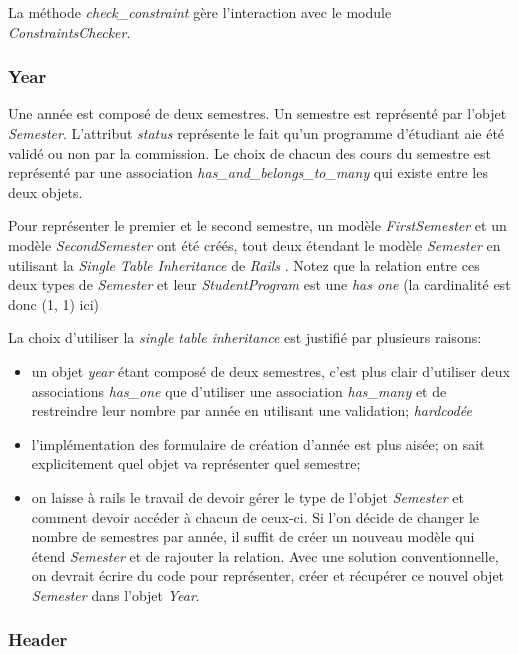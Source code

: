 La méthode \textit{check\_constraint} gère l’interaction avec le module \textit{ConstraintsChecker}. 

\subsubsection{Year}

Une année est composé de deux semestres. Un semestre est représenté par l'objet \textit{Semester}. L'attribut \textit{status} représente le fait qu'un programme d'étudiant aie été validé ou non par la commission. Le choix de chacun des cours du semestre est représenté par une association \textit{has\_and\_belongs\_to\_many} qui existe entre les deux objets.

Pour représenter le premier et le second semestre, un modèle \textit{FirstSemester} et un modèle \textit{SecondSemester} ont été créés, tout deux étendant le modèle \textit{Semester} en utilisant la \textit{Single Table Inheritance} de \textit{Rails} \cite{STI}. Notez que la relation entre ces deux types de \textit{Semester} et leur \textit{StudentProgram} est une \textit{has one} (la cardinalité est donc (1, 1) ici)

La choix d'utiliser la \textit{single table inheritance} est justifié par plusieurs raisons:
\begin{itemize}
  \item un objet \textit{year} étant composé de deux semestres, c'est plus clair d'utiliser deux associations \textit{has\_one} que d'utiliser une association \textit{has\_many} et de restreindre leur nombre par année en utilisant une validation; \textit{hardcodée}
  \item l'implémentation des formulaire de création d'année est plus aisée; on sait explicitement quel objet va représenter quel semestre;
  \item on laisse à rails le travail de devoir gérer le type de l'objet \textit{Semester} et comment devoir accéder à chacun de ceux-ci. Si l'on décide de changer le nombre de semestres par année, il suffit de créer un nouveau modèle qui étend \textit{Semester} et de rajouter la relation. Avec une solution conventionnelle, on devrait écrire du code pour représenter, créer et récupérer ce nouvel objet \textit{Semester} dans l'objet \textit{Year}. 
\end{itemize}


\subsubsection{Header}

